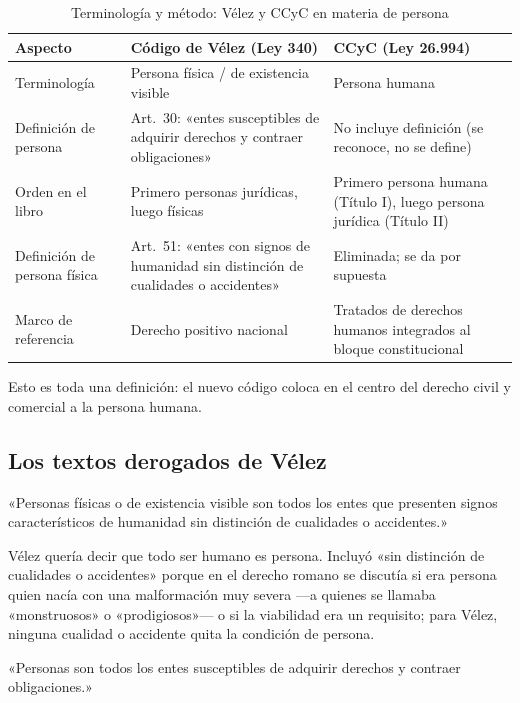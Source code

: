 \documentclass[12pt,oneside]{book}
\begin{document}
\begin{table}[H]
\centering
\begin{tabularx}{\textwidth}{B{0.20\textwidth} Y Y}
\toprule
\textbf{Aspecto} & \textbf{Código de Vélez (Ley 340)} & \textbf{CCyC (Ley 26.994)} \\
\midrule
Terminología & Persona física / de existencia visible & Persona humana \\
Definición de persona & Art.~30: «entes susceptibles de adquirir derechos y contraer obligaciones» & No incluye definición (se reconoce, no se define) \\
Orden en el libro & Primero personas jurídicas, luego físicas & Primero persona humana (Título I), luego persona jurídica (Título II) \\
Definición de persona física & Art.~51: «entes con signos de humanidad sin distinción de cualidades o accidentes» & Eliminada; se da por supuesta \\
Marco de referencia & Derecho positivo nacional & Tratados de derechos humanos integrados al bloque constitucional \\
\bottomrule
\end{tabularx}
\caption{Terminología y método: Vélez y CCyC en materia de persona}
\end{table}

Esto es toda una definición: el nuevo código coloca en el centro del derecho civil y comercial a la persona humana.

\subsection{Los textos derogados de Vélez}

\begin{nota}
«Personas físicas o de existencia visible son todos los entes que presenten signos característicos de humanidad sin distinción de cualidades o accidentes.»
\end{nota}

Vélez quería decir que todo ser humano es persona. Incluyó «sin distinción de cualidades o accidentes» porque en el derecho romano se discutía si era persona quien nacía con una malformación muy severa ---a quienes se llamaba «monstruosos» o «prodigiosos»--- o si la viabilidad era un requisito; para Vélez, ninguna cualidad o accidente quita la condición de persona.

\begin{nota}
«Personas son todos los entes susceptibles de adquirir derechos y contraer obligaciones.»
\end{nota}
\end{document}

